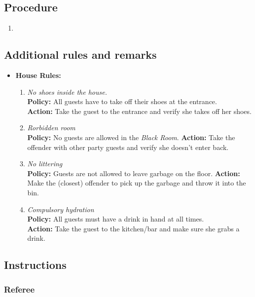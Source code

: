 \subsection*{Procedure}
	\begin{enumerate}[nosep]
		\item
	\end{enumerate}


\subsection*{Additional rules and remarks}
\begin{itemize}[nosep]
	\item \textbf{House Rules:}
	\begin{enumerate}[nosep]
		\item \textit{No shoes inside the house.}\\
		\textbf{Policy:} All guests have to take off their shoes at the entrance.\\
		\textbf{Action:} Take the guest to the entrance and verify she takes off her shoes.
	
		\item \textit{Rorbidden room}\\
		\textbf{Policy:} No guests are allowed in the \emph{Black Room}.
		\textbf{Action:} Take the offender with other party guests and verify she doesn't enter back.
	
		\item \textit{No littering}\\
		\textbf{Policy:} Guests are not allowed to leave garbage on the floor.
		\textbf{Action:} Make the (closest) offender to pick up the garbage and throw it into the bin.
	
		\item \textit{Compulsory hydration}\\
		\textbf{Policy:} All guests must have a drink in hand at all times.\\
		\textbf{Action:} Take the guest to the kitchen/bar and make sure she grabs a drink.
	\end{enumerate}
\end{itemize}

\subsection*{Instructions}
\subsubsection*{Referee}

